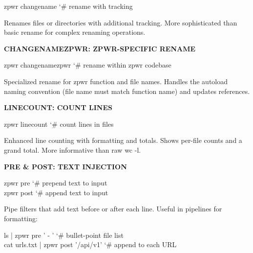 \documentclass[11pt,a4paper,twoside]{book}
\begin{document}
\begin{codebox}
\color{neongreen}zpwr changename                     {\char`\#} rename with tracking\\
\end{codebox}

Renames files or directories with additional tracking. More sophisticated than basic rename for complex renaming operations.


\vspace{12pt}
{\bfseries\color{neonyellow} CHANGENAMEZPWR: \textbf{ZPWR}-SPECIFIC RENAME}\vspace{4pt}

\begin{codebox}
\color{neongreen}zpwr changenamezpwr                 {\char`\#} rename within zpwr codebase\\
\end{codebox}

Specialized rename for zpwr function and file names. Handles the autoload naming convention (file name must match function name) and updates references.


\vspace{12pt}
{\bfseries\color{neonyellow} LINECOUNT: COUNT \textbf{LINES}}\vspace{4pt}

\begin{codebox}
\color{neongreen}zpwr linecount                      {\char`\#} count lines in files\\
\end{codebox}

Enhanced line counting with formatting and totals. Shows per-file counts and a grand total. More informative than raw wc -l.


\vspace{12pt}
{\bfseries\color{neonyellow} PRE \& POST: TEXT INJECTION}\vspace{4pt}

\begin{codebox}
\color{neongreen}zpwr pre                            {\char`\#} prepend text to input\\
\color{neongreen}zpwr post                           {\char`\#} append text to input\\
\end{codebox}

Pipe filters that add text before or after each line. Useful in pipelines for formatting:

\begin{codebox}
\color{neongreen}ls | zpwr pre '  - '               {\char`\#} bullet-point file list\\
\color{neongreen}cat urls.txt | zpwr post '/api/v1'  {\char`\#} append to each URL\\
\end{codebox}
\end{document}

